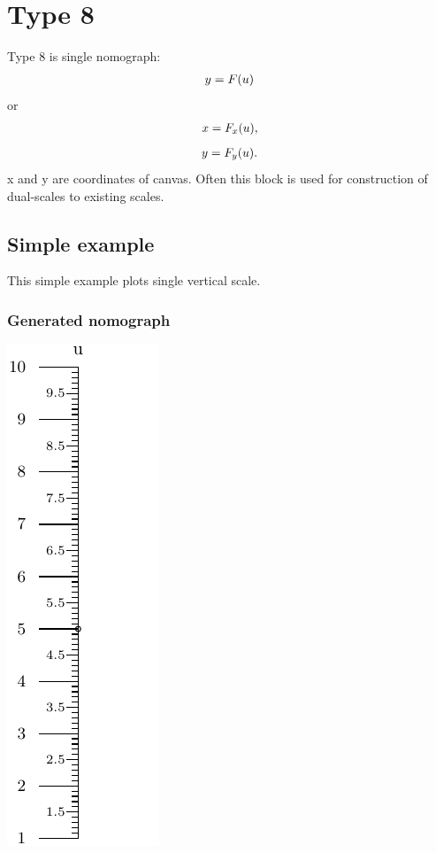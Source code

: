 \documentclass[a4paper,11pt,english]{sphinxmanual}
\begin{document}
\section{Type 8}
\label{types/types:type8-ref}\label{types/types:type-8}
Type 8 is single nomograph:
\begin{gather}
\begin{split}y = F(u)\end{split}\notag
\end{gather}
or
\begin{gather}
\begin{split}x = F_x(u),\end{split}\notag
\end{gather}\begin{gather}
\begin{split}y = F_y(u).\end{split}\notag
\end{gather}
x and y are coordinates of canvas.
Often this block is used for construction of dual-scales to
existing scales.


\subsection{Simple example}
\label{types/types:id53}
This simple example plots single vertical scale.


\subsubsection{Generated nomograph}
\label{types/types:id54}
\includegraphics{ex_type8_nomo_1.pdf}
\end{document}
